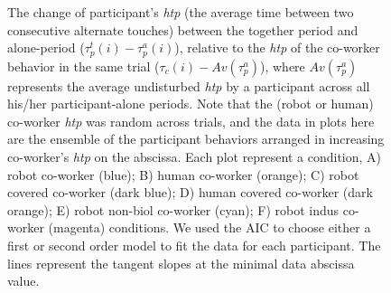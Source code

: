 \begin{figure}[hbpt]
	\caption{The change of participant's {\it htp} (the average time between two consecutive alternate touches) between the together period and alone-period ($\tau_p^t(i)-\tau_p^a(i)$), relative to the {\it htp} of the co-worker behavior in the same trial ($\tau_c (i)-Av(\tau_p^a)$), where $Av(\tau_p^a)$ represents the average undisturbed {\it htp} by a participant across all his/her participant-alone periods. Note that the (robot or human) co-worker {\it htp} was random across trials, and the data in plots here are the ensemble of the participant behaviors arranged in increasing co-worker's {\it htp} on the abscissa. Each plot represent a condition, A) robot co-worker (blue); B) human co-worker (orange); C) robot covered co-worker (dark blue); D) human covered co-worker (dark orange); E) robot non-biol co-worker (cyan); F) robot indus co-worker (magenta) conditions. We used the AIC to choose either a first or second order model to fit the data for each participant. The lines represent the tangent slopes at the minimal data abscissa value.}
	\label{fig:allfit}
\end{figure}


